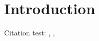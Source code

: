 \section{Introduction}
\label{sec:intro}


Citation test: \cite{Jiang2011}, \cite{DeepChord}, \cite{Chordthesizer}